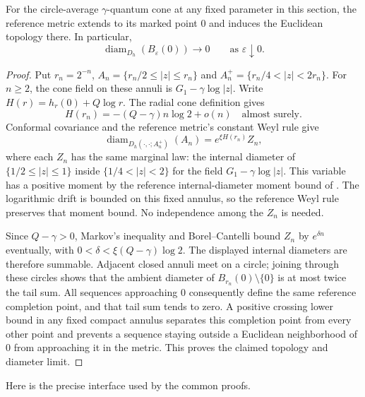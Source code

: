 \begin{lemma}
\label{common:cone-mark-continuity}
For the circle-average $\gamma$-quantum cone at any fixed parameter
in this section, the reference metric extends to its marked point
$0$ and induces the Euclidean topology there.  In particular,
\[
 \operatorname{diam}_{D_h}(B_\varepsilon(0))\longrightarrow0
 \qquad\text{as }\varepsilon\downarrow0.
\]
\end{lemma}
\begin{proof}
Put $r_n=2^{-n}$, $A_n=\{r_n/2\le|z|\le r_n\}$ and
$A_n^+=\{r_n/4<|z|<2r_n\}$.  For $n\ge2$, the cone field on
these annuli is $G_1-\gamma\log|z|$.  Write
$H(r)=h_r(0)+Q\log r$.  The radial cone definition gives
\[
 H(r_n)=-(Q-\gamma)n\log2+o(n)\quad\text{almost surely}.
\]
Conformal covariance and the reference metric's constant Weyl rule
give
\[
 \operatorname{diam}_{D_h(\cdot,\cdot;A_n^+)}(A_n)
       =e^{\xi H(r_n)}Z_n,
\]
where each $Z_n$ has the same marginal law: the internal diameter
of $\{1/2\le|z|\le1\}$ inside $\{1/4<|z|<2\}$ for the field
$G_1-\gamma\log|z|$.  This variable has a positive moment by the
reference internal-diameter moment bound of
\cite[Theorem~1.8]{DFGPSWeakMetric}.  The logarithmic drift is bounded
on this fixed annulus, so the reference Weyl rule preserves that
moment bound.  No independence among the $Z_n$ is needed.

Since $Q-\gamma>0$, Markov's inequality and Borel--Cantelli bound
$Z_n$ by $e^{\delta n}$ eventually, with
$0<\delta<\xi(Q-\gamma)\log2$.  The displayed internal diameters
are therefore summable.  Adjacent closed annuli meet on a circle;
joining through these circles shows that the ambient diameter of
$B_{r_n}(0)\setminus\{0\}$ is at most twice the tail sum.  All
sequences approaching $0$ consequently define the same reference
completion point, and that tail sum tends to zero.  A positive
crossing lower bound in any fixed compact annulus separates this
completion point from every other point and prevents a sequence
staying outside a Euclidean neighborhood of $0$ from approaching it
in the metric.  This proves the claimed topology and diameter limit.
\end{proof}

Here is the precise interface used by the common proofs.

